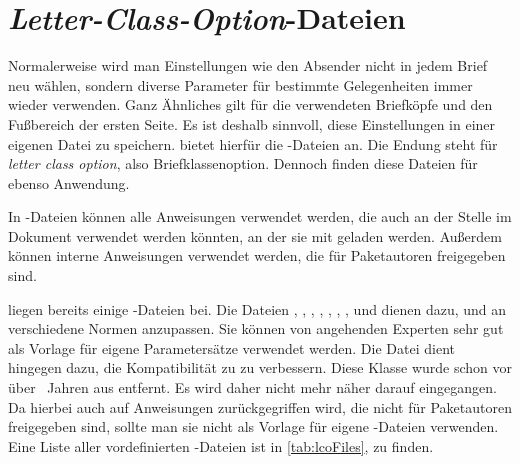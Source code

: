 

\section{\emph{Letter-Class-Option}-Dateien}
%
\BeginIndexGroup
{}%
%

Normalerweise wird man Einstellungen wie den Absender nicht in jedem Brief neu
wählen, sondern diverse Parameter für bestimmte Gelegenheiten immer wieder
verwenden. Ganz Ähnliches gilt für die verwendeten Briefköpfe und den
Fußbereich der ersten Seite. Es ist deshalb sinnvoll, diese Einstellungen in
einer eigenen Datei zu speichern. \KOMAScript{} bietet
hierfür die -Dateien an. Die Endung  steht
für \emph{\emph{l}etter \emph{c}lass \emph{o}ption}, also
Briefklassenoption. Dennoch finden diese Dateien für 
ebenso Anwendung.

In -Dateien können alle Anweisungen verwendet werden, die auch an
der Stelle im Dokument verwendet werden könnten, an der
sie mit 
geladen werden. Außerdem können interne Anweisungen verwendet werden, die für
Paketautoren freigegeben sind.%
\iffalse %
Bei \Class{scrlttr2} und \Package{scrletter}
sind dies insbesondere die Anweisungen
\DescRef{\LabelBase.cmd.newplength}\IndexCmd{newplength},
\DescRef{\LabelBase.cmd.setplength}\IndexCmd{setplength} und
\DescRef{\LabelBase.cmd.addtoplength}\IndexCmd{addtoplength} (siehe
\autoref{sec:\LabelBase.pseudoLength}).%
\fi

\KOMAScript{} liegen bereits einige -Dateien bei. Die Dateien
, ,
,
, ,
, ,  und
 dienen dazu, 
und  an verschiedene Normen anzupassen. Sie
können von angehenden Experten sehr gut als Vorlage für eigene Parametersätze
verwendet werden. Die Datei  dient hingegen dazu, die
Kompatibilität zu  zu verbessern. Diese
Klasse wurde schon vor über \the\numexpr {}\relax~Jahren aus
\KOMAScript{} entfernt. Es wird daher nicht mehr näher darauf eingegangen. Da
hierbei auch auf Anweisungen zurückgegriffen wird, die nicht für Paketautoren
freigegeben sind, sollte man sie nicht als Vorlage für eigene
-Dateien verwenden. Eine Liste aller vordefinierten
-Dateien ist in \autoref{tab:lcoFiles}, 
zu finden.

